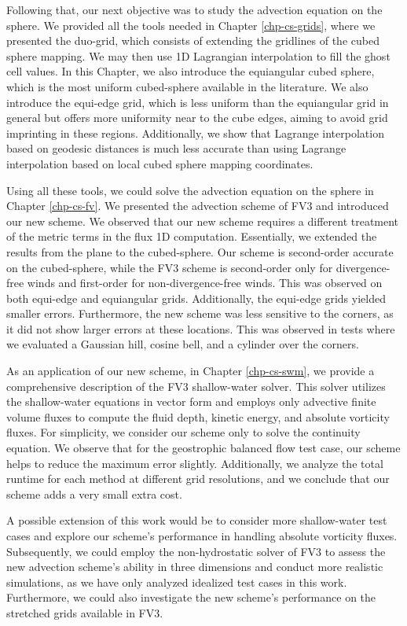 Following that, our next objective was to study the advection equation on the sphere. 
We provided all the tools needed in Chapter \ref{chp-cs-grids}, 
where we presented the duo-grid, which consists of extending the gridlines of the cubed sphere mapping. 
We may then use 1D Lagrangian interpolation to fill the ghost cell values.
In this Chapter, we also introduce the equiangular cubed sphere, which is the most uniform cubed-sphere available in the literature.
We also introduce the equi-edge grid, which is less uniform than the equiangular grid in general but offers more uniformity near to the cube edges,
aiming to avoid grid imprinting in these regions.
Additionally, we show that Lagrange interpolation based on geodesic distances 
is much less accurate than using Lagrange interpolation based on local cubed sphere mapping coordinates.

Using all these tools, we could solve the advection equation on the sphere in Chapter \ref{chp-cs-fv}.
We presented the advection scheme of FV3 and introduced our new scheme. We observed that our new scheme
requires a different treatment of the metric terms in the flux 1D computation.
Essentially, we extended the results from the plane to the cubed-sphere.
Our scheme is second-order accurate on the cubed-sphere, 
while the FV3 scheme is second-order only for divergence-free winds and first-order for non-divergence-free winds.
This was observed on both equi-edge and equiangular grids. Additionally, the equi-edge grids yielded smaller errors.
Furthermore, the new scheme was less sensitive to the corners, as it did not show larger errors at these locations. 
This was observed in tests where we evaluated a Gaussian hill, cosine bell, and a cylinder over the corners.

As an application of our new scheme, in Chapter \ref{chp-cs-swm}, we provide a comprehensive description of the FV3 shallow-water solver.
This solver utilizes the shallow-water equations in vector form and employs only advective finite volume fluxes
to compute the fluid depth, kinetic energy, and absolute vorticity fluxes. 
For simplicity, we consider our scheme only to solve the continuity equation.
We observe that for the geostrophic balanced flow test case, our scheme helps to reduce the maximum error slightly.
Additionally, we analyze the total runtime for each method at different grid resolutions, and we conclude that our scheme adds a very small extra cost.

A possible extension of this work would be to consider more shallow-water test cases and explore our scheme's performance in handling absolute vorticity fluxes.
Subsequently, we could employ the non-hydrostatic solver of FV3 to assess the new advection scheme's ability 
in three dimensions and conduct more realistic simulations, as we have only analyzed idealized test cases in this work.
Furthermore, we could also investigate the new scheme's performance on the stretched grids available in FV3.